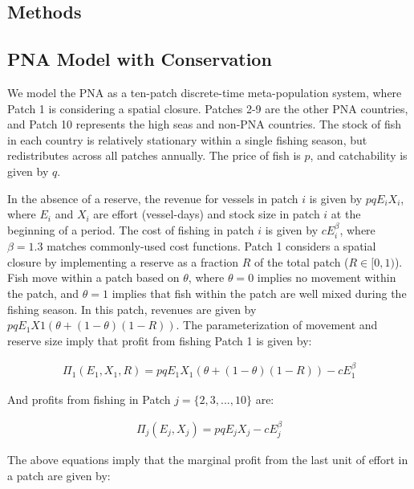 \documentclass[9p,twocolumn,twoside,lineno]{pnas-new}
\begin{document}
\begin{scriptsize}

\section{Methods}

\subsection{PNA Model with Conservation}

We model the PNA as a ten-patch discrete-time meta-population system, where Patch 1 is considering a spatial closure. Patches 2-9 are the other PNA countries, and Patch 10 represents the high seas and non-PNA countries. The stock of fish in each country is relatively stationary within a single fishing season, but redistributes across all patches annually. The price of fish is $p$, and catchability is given by $q$.

In the absence of a reserve, the revenue for vessels in patch $i$ is given by $pqE_iX_i$, where $E_i$ and $X_i$ are effort (vessel-days) and stock size in patch $i$ at the beginning of a period. The cost of fishing in patch $i$ is given by $cE_i^\beta$, where $\beta = 1.3$ matches commonly-used cost functions. Patch 1 considers a spatial closure by implementing a reserve as a fraction $R$ of the total patch ($R \in[0,1)$). Fish move within a patch based on $\theta$, where $\theta = 0$ implies no movement within the patch, and $\theta = 1$ implies that fish within the patch are well mixed during the fishing season. In this patch, revenues are given by $pqE_1X1(\theta + (1 - \theta)(1 - R))$. The parameterization of movement and reserve size imply that profit from fishing Patch 1 is given by:

\begin{figure}[H]	
	\begin{align}
	\Pi_1(E_1,X_1,R) = pqE_1X_1(\theta + (1 - \theta)(1 - R))-cE_1^\beta
	\end{align}
\end{figure}

And profits from fishing in Patch $j = \{2, 3, ..., 10\}$ are:

\begin{figure}[H]	
	\begin{align}
	\Pi_j(E_j,X_j) = pqE_jX_j-cE_j^\beta
	\end{align}
\end{figure}

The above equations imply that the marginal profit from the last unit of effort in a patch are given by:


\end{scriptsize}
\end{document}
